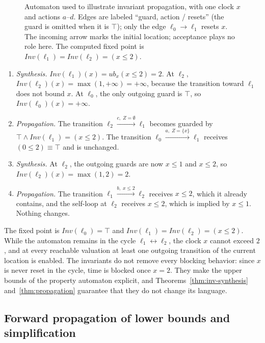 \begin{figure}[t]
\centering

\caption{Automaton used to illustrate invariant propagation, with one clock $x$
and actions $a$--$d$.  Edges are labeled ``guard, action / resets'' (the guard
is omitted when it is $\top$); only the edge $\ell_0\to\ell_1$ resets $x$.  The
incoming arrow marks the initial location; acceptance plays no role here.  The
computed fixed point is $\mathit{Inv}(\ell_1)=\mathit{Inv}(\ell_2)=(x\le2)$.}
\label{fig:inv-example}
\end{figure}

\begin{enumerate}
\item \emph{Synthesis.}  $\mathit{Inv}(\ell_1)(x)=\mathit{ub}_x(x\le2)=2$.  At
$\ell_2$, $\mathit{Inv}(\ell_2)(x)=\max(1,+\infty)=+\infty$, because the
transition toward $\ell_1$ does not bound $x$.  At $\ell_0$, the only outgoing
guard is $\top$, so $\mathit{Inv}(\ell_0)(x)=+\infty$.

\item \emph{Propagation.}  The transition
$\ell_2\xrightarrow{c,\;Z=\emptyset}\ell_1$ becomes guarded by
$\top\wedge\mathit{Inv}(\ell_1)=(x\le2)$.  The transition
$\ell_0\xrightarrow{a,\;Z=\{x\}}\ell_1$ receives $(0\le2)\equiv\top$ and is
unchanged.

\item \emph{Synthesis.}  At $\ell_2$, the outgoing guards are now $x\le1$ and
$x\le2$, so $\mathit{Inv}(\ell_2)(x)=\max(1,2)=2$.

\item \emph{Propagation.}  The transition $\ell_1\xrightarrow{b,\;x\le2}\ell_2$
receives $x\le2$, which it already contains, and the self-loop at $\ell_2$
receives $x\le2$, which is implied by $x\le1$.  Nothing changes.
\end{enumerate}
The fixed point is $\mathit{Inv}(\ell_0)=\top$ and
$\mathit{Inv}(\ell_1)=\mathit{Inv}(\ell_2)=(x\le2)$.  While the automaton
remains in the cycle $\ell_1\leftrightarrow\ell_2$, the clock $x$ cannot exceed
$2$, and at every reachable valuation at least one outgoing transition of the
current location is enabled.  The invariants do not remove every blocking
behavior: since $x$ is never reset in the cycle, time is blocked once $x=2$.
They make the upper bounds of the property automaton explicit, and
Theorems~\ref{thm:inv-synthesis} and~\ref{thm:propagation} guarantee that they
do not change its language.

\subsection{Forward propagation of lower bounds and simplification}
\label{sec:forward}\label{sec:main-forward}
